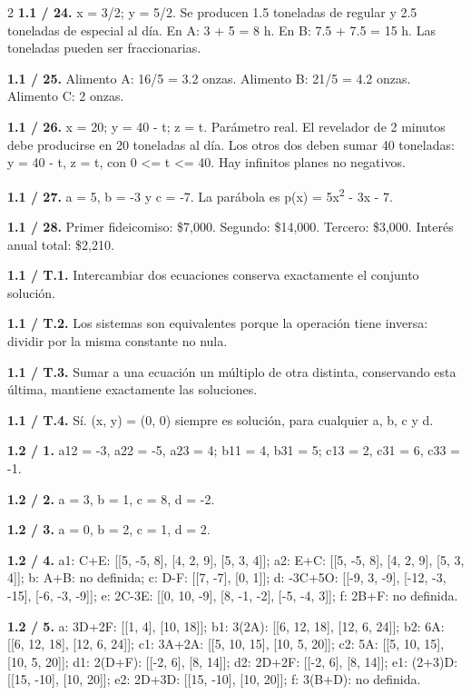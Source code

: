 \documentclass[11pt,a4paper,landscape]{article}
\begin{document}
\begin{multicols}{2}
\textbf{1.1 / 24.} x = 3/2; y = 5/2. Se producen 1.5 toneladas de regular y 2.5 toneladas de especial al día. En A: 3 + 5 = 8 h. En B: 7.5 + 7.5 = 15 h. Las toneladas pueden ser fraccionarias.\par\smallskip
\textbf{1.1 / 25.} Alimento A: 16/5 = 3.2 onzas. Alimento B: 21/5 = 4.2 onzas. Alimento C: 2 onzas.\par\smallskip
\textbf{1.1 / 26.} x = 20; y = 40 - t; z = t. Parámetro real. El revelador de 2 minutos debe producirse en 20 toneladas al día. Los otros dos deben sumar 40 toneladas: y = 40 - t, z = t, con 0 <= t <= 40. Hay infinitos planes no negativos.\par\smallskip
\textbf{1.1 / 27.} a = 5, b = -3 y c = -7. La parábola es p(x) = 5x\textsuperscript{2} - 3x - 7.\par\smallskip
\textbf{1.1 / 28.} Primer fideicomiso: \$7,000. Segundo: \$14,000. Tercero: \$3,000. Interés anual total: \$2,210.\par\smallskip
\textbf{1.1 / T.1.} Intercambiar dos ecuaciones conserva exactamente el conjunto solución.\par\smallskip
\textbf{1.1 / T.2.} Los sistemas son equivalentes porque la operación tiene inversa: dividir por la misma constante no nula.\par\smallskip
\textbf{1.1 / T.3.} Sumar a una ecuación un múltiplo de otra distinta, conservando esta última, mantiene exactamente las soluciones.\par\smallskip
\textbf{1.1 / T.4.} Sí. (x, y) = (0, 0) siempre es solución, para cualquier a, b, c y d.\par\smallskip
\textbf{1.2 / 1.} a12 = -3, a22 = -5, a23 = 4; b11 = 4, b31 = 5; c13 = 2, c31 = 6, c33 = -1.\par\smallskip
\textbf{1.2 / 2.} a = 3, b = 1, c = 8, d = -2.\par\smallskip
\textbf{1.2 / 3.} a = 0, b = 2, c = 1, d = 2.\par\smallskip
\textbf{1.2 / 4.} a1: C+E: [[5, -5, 8], [4, 2, 9], [5, 3, 4]]; a2: E+C: [[5, -5, 8], [4, 2, 9], [5, 3, 4]]; b: A+B: no definida; c: D-F: [[7, -7], [0, 1]]; d: -3C+5O: [[-9, 3, -9], [-12, -3, -15], [-6, -3, -9]]; e: 2C-3E: [[0, 10, -9], [8, -1, -2], [-5, -4, 3]]; f: 2B+F: no definida.\par\smallskip
\textbf{1.2 / 5.} a: 3D+2F: [[1, 4], [10, 18]]; b1: 3(2A): [[6, 12, 18], [12, 6, 24]]; b2: 6A: [[6, 12, 18], [12, 6, 24]]; c1: 3A+2A: [[5, 10, 15], [10, 5, 20]]; c2: 5A: [[5, 10, 15], [10, 5, 20]]; d1: 2(D+F): [[-2, 6], [8, 14]]; d2: 2D+2F: [[-2, 6], [8, 14]]; e1: (2+3)D: [[15, -10], [10, 20]]; e2: 2D+3D: [[15, -10], [10, 20]]; f: 3(B+D): no definida.\par\smallskip

\end{multicols}
\end{document}
